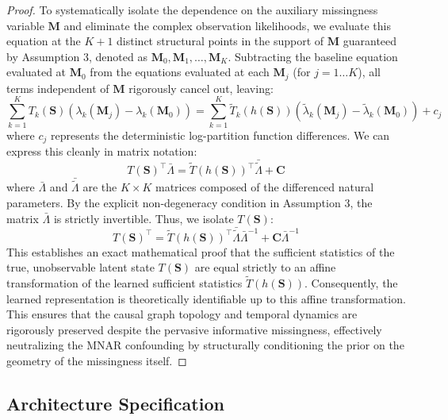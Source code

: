 \begin{proof}
To systematically isolate the dependence on the auxiliary missingness variable $\mathbf{M}$ and eliminate the complex observation likelihoods, we evaluate this equation at the $K+1$ distinct structural points in the support of $\mathbf{M}$ guaranteed by Assumption 3, denoted as $\mathbf{M}_0, \mathbf{M}_1, \dots, \mathbf{M}_K$. Subtracting the baseline equation evaluated at $\mathbf{M}_0$ from the equations evaluated at each $\mathbf{M}_j$ (for $j = 1 \dots K$), all terms independent of $\mathbf{M}$ rigorously cancel out, leaving:
\begin{equation}
\sum_{k=1}^K T_k(\mathbf{S}) \left( \lambda_k(\mathbf{M}_j) - \lambda_k(\mathbf{M}_0) \right) = \sum_{k=1}^K \tilde{T}_k(h(\mathbf{S})) \left( \tilde{\lambda}_k(\mathbf{M}_j) - \tilde{\lambda}_k(\mathbf{M}_0) \right) + c_j
\end{equation}
where $c_j$ represents the deterministic log-partition function differences. We can express this cleanly in matrix notation:
\begin{equation}
T(\mathbf{S})^\top \bar{\Lambda} = \tilde{T}(h(\mathbf{S}))^\top \bar{\tilde{\Lambda}} + \mathbf{C}
\end{equation}
where $\bar{\Lambda}$ and $\bar{\tilde{\Lambda}}$ are the $K \times K$ matrices composed of the differenced natural parameters. By the explicit non-degeneracy condition in Assumption 3, the matrix $\bar{\Lambda}$ is strictly invertible. Thus, we isolate $T(\mathbf{S})$:
\begin{equation}
T(\mathbf{S})^\top = \tilde{T}(h(\mathbf{S}))^\top \bar{\tilde{\Lambda}} \bar{\Lambda}^{-1} + \mathbf{C} \bar{\Lambda}^{-1}
\end{equation}
This establishes an exact mathematical proof that the sufficient statistics of the true, unobservable latent state $T(\mathbf{S})$ are equal strictly to an affine transformation of the learned sufficient statistics $\tilde{T}(h(\mathbf{S}))$. Consequently, the learned representation is theoretically identifiable up to this affine transformation. This ensures that the causal graph topology and temporal dynamics are rigorously preserved despite the pervasive informative missingness, effectively neutralizing the MNAR confounding by structurally conditioning the prior on the geometry of the missingness itself.
\end{proof}

\subsection{Architecture Specification}

